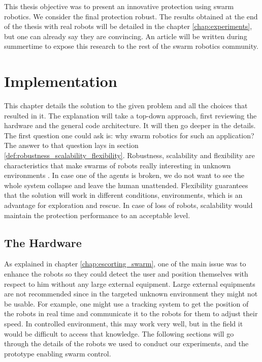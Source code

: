 \documentclass[oneside, a4paper, 12pt]{memoir}
\begin{document}
This thesis objective was to present an innovative protection using swarm robotics. We consider the final protection robust. The results obtained at the end of the thesis with real robots will be detailed in the chapter \ref{chap:experiments}, but one can already say they are convincing. An article will be written during summertime to expose this research to the rest of the swarm robotics community.

\chapter{Implementation}

	This chapter details the solution to the given problem and all the choices that resulted in it. The explanation will take a top-down approach, first reviewing the hardware and the general code architecture. It will then go deeper in the details.\\
	
	The first question one could ask is: why swarm robotics for such an application? The answer to that question lays in section \ref{def:robustness_scalability_flexibility}. Robustness, scalability and flexibility are characteristics that make swarms of robots really interesting in unknown environments \citep{brambilla2013swarm}. In case one of the agents is broken, we do not want to see the whole system collapse and leave the human unattended. Flexibility guarantees that the solution will work in different conditions, environments, which is an advantage for exploration and rescue. In case of loss of robots, scalability would maintain the protection performance to an acceptable level.
	
	\section{The Hardware}
	
	As explained in chapter \ref{chap:escorting_swarm}, one of the main issue was to enhance the robots so they could detect the user and position themselves with respect to him without any large external equipment. Large external equipments are not recommended since in the targeted unknown environment they might not be usable. For example, one might use a tracking system to get the position of the robots in real time and communicate it to the robots for them to adjust their speed. In controlled environment, this may work very well, but in the field it would be difficult to access that knowledge. The following sections will go through the details of the robots we used to conduct our experiments, and the prototype enabling swarm control.
	
\end{document}
